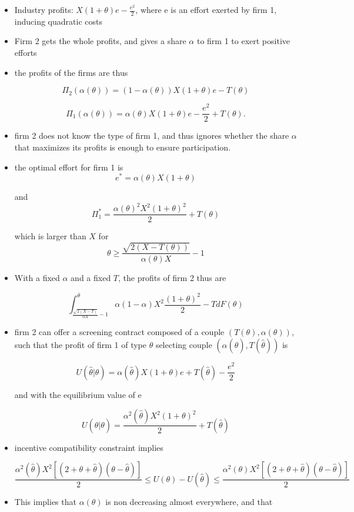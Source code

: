 \documentclass[a4paper]{article}
\renewcommand{\th}{\hat\theta}
\renewcommand{\t}{\theta}
\renewcommand{\a}{\alpha}
\begin{document}
\begin{itemize}
    \item Industry profits: $X(1+\t)e-\frac{e^2}{2}$, where e is an effort exerted by firm 1, inducing quadratic costs
    \item Firm 2 gets the whole profits, and gives a share $\a$ to firm 1 to exert positive efforts
    \item the profits of the firms are thus
    
    $$\Pi_2(\a(\t))= (1-\a(\t))X(1+\t)e-T(\t)$$

    \[\Pi_1(\a(\t))= \a(\t) X(1+\t)e-\frac{e^2}{2}+T(\t).\]
    
    \item firm 2 does not know the type of firm 1, and thus ignores whether the share $\a$ that maximizes its profits is enough to ensure participation.
    
    \item the optimal effort for firm 1 is $$e^*=\a(\t) X(1+\t)$$ 
    
    and $$\Pi_1^*=\frac{\a(\t)^2 X^2(1+\t)^2}{2}+T(\t)$$
    
    which is larger than $X$ for $$\t\geq \frac{\sqrt{2 (X-T(\t))}}{\a(\t) X}-1$$
    
    \item With a fixed $\a$ and a fixed $T$, the profits of firm 2 thus are
    
    $$\int_{\frac{\sqrt{2 (X-T)}}{\a X}-1}^{\overline \t}\a(1-\a)X^2\frac{(1+\t)^2}{2}-T dF(\t)$$
    
    \item firm 2 can offer a screening contract composed of a couple $(T(\t),\a(\t))$, such that the profit of firm 1 of type $\t$ selecting couple $(\a(\th), T(\th))$ is
    
    $$U(\hat \t|\t)=\a(\hat \t) X(1+\t)e+T(\hat \t)-\frac{e^2}{2}$$
    
    and with the equilibrium value of e
    
    $$U(\hat \t|\t)=\frac{\a^2(\hat \t) X^2(1+\t)^2}{2}+ T(\hat \t)$$
    
    \item incentive compatibility constraint implies  
    
    $$\frac{\a^2(\hat \t) X^2[(2+\t+\hat \t)(\t - \hat \t)]}{2}\leq U(\t)-U(\hat \t)\leq \frac{\a^2(\t) X^2[(2+\t+\hat \t)(\t - \hat \t)]}{2}$$
    \item This implies that $\a(\t)$ is non decreasing almost everywhere, and that 
    

\end{itemize}
\end{document}
